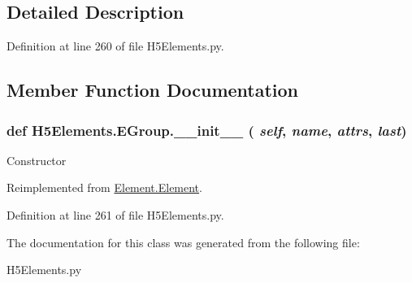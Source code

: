 \subsection{Detailed Description}


Definition at line 260 of file H5Elements.py.

\subsection{Member Function Documentation}
\hypertarget{classH5Elements_1_1EGroup_a3ab898c36d1fa91a226417a3296a651b}{
\subsubsection[{\_\-\_\-init\_\-\_\-}]{\setlength{\rightskip}{0pt plus 5cm}def H5Elements.EGroup.\_\-\_\-init\_\-\_\- ( {\em self}, \/   {\em name}, \/   {\em attrs}, \/   {\em last})}}
\label{classH5Elements_1_1EGroup_a3ab898c36d1fa91a226417a3296a651b}
\begin{DoxyVerb}Constructor \end{DoxyVerb}
 

Reimplemented from \hyperlink{classElement_1_1Element_a359371465b7c4d21611adec7e86c3b33}{Element.Element}.

Definition at line 261 of file H5Elements.py.

The documentation for this class was generated from the following file:\begin{DoxyCompactItemize}
\item 
H5Elements.py\end{DoxyCompactItemize}
